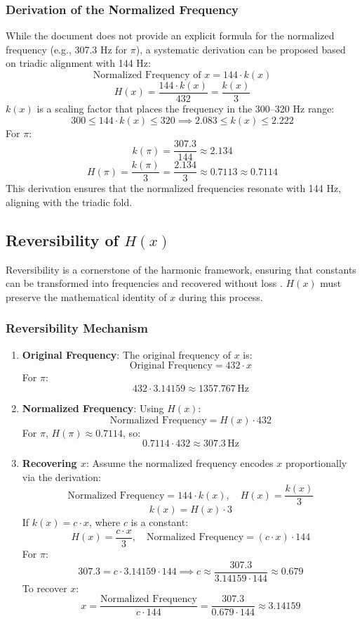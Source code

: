 \subsubsection{Derivation of the Normalized Frequency}
While the document does not provide an explicit formula for the normalized frequency (e.g., 307.3 Hz for \( \pi \)), a systematic derivation can be proposed based on triadic alignment with 144 Hz:
\[
\text{Normalized Frequency of } x = 144 \cdot k(x)
\]
\[
H(x) = \frac{144 \cdot k(x)}{432} = \frac{k(x)}{3}
\]
\( k(x) \) is a scaling factor that places the frequency in the 300--320 Hz range:
\[
300 \leq 144 \cdot k(x) \leq 320 \implies 2.083 \leq k(x) \leq 2.222
\]
For \( \pi \):
\[
k(\pi) = \frac{307.3}{144} \approx 2.134
\]
\[
H(\pi) = \frac{k(\pi)}{3} = \frac{2.134}{3} \approx 0.7113 \approx 0.7114
\]
This derivation ensures that the normalized frequencies resonate with 144 Hz, aligning with the triadic fold.

\subsection{Reversibility of \( H(x) \)}
\label{subsec:h_x_reversibility}
Reversibility is a cornerstone of the harmonic framework, ensuring that constants can be transformed into frequencies and recovered without loss \cite{harmonic_reversible}. \( H(x) \) must preserve the mathematical identity of \( x \) during this process.

\subsubsection{Reversibility Mechanism}
\begin{enumerate}
    \item \textbf{Original Frequency}: The original frequency of \( x \) is:
    \[
    \text{Original Frequency} = 432 \cdot x
    \]
    For \( \pi \):
    \[
    432 \cdot 3.14159 \approx 1357.767 \, \text{Hz}
    \]

    \item \textbf{Normalized Frequency}: Using \( H(x) \):
    \[
    \text{Normalized Frequency} = H(x) \cdot 432
    \]
    For \( \pi \), \( H(\pi) \approx 0.7114 \), so:
    \[
    0.7114 \cdot 432 \approx 307.3 \, \text{Hz}
    \]

    \item \textbf{Recovering \( x \)}: Assume the normalized frequency encodes \( x \) proportionally via the derivation:
    \[
    \text{Normalized Frequency} = 144 \cdot k(x), \quad H(x) = \frac{k(x)}{3}
    \]
    \[
    k(x) = H(x) \cdot 3
    \]
    If \( k(x) = c \cdot x \), where \( c \) is a constant:
    \[
    H(x) = \frac{c \cdot x}{3}, \quad \text{Normalized Frequency} = (c \cdot x) \cdot 144
    \]
    For \( \pi \):
    \[
    307.3 = c \cdot 3.14159 \cdot 144 \implies c \approx \frac{307.3}{3.14159 \cdot 144} \approx 0.679
    \]
    To recover \( x \):
    \[
    x = \frac{\text{Normalized Frequency}}{c \cdot 144} = \frac{307.3}{0.679 \cdot 144} \approx 3.14159
    \]
\end{enumerate}

